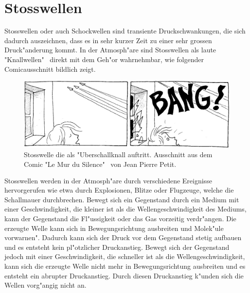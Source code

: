 \chapter{Stosswellen}
\begin{refsection}


Stosswellen oder auch Schockwellen sind transiente Druckschwankungen,
die sich dadurch auszeichnen, dass es in sehr kurzer Zeit zu einer sehr
grossen Druck"anderung kommt.
In der Atmosph"are sind Stosswellen als laute "Knallwellen" \, direkt
mit dem Geh"or wahrnehmbar, wie folgender Comicausschnitt bildlich zeigt.
\begin{figure}[h]
\begin{center}
\includegraphics[width=\hsize]{stosswellen/ueberschall.jpg}
\end{center}
\caption{Stosswelle die als "Uberschallknall auftritt. Ausschnitt aus dem Comic "Le Mur du Silence" \, von Jean Pierre Petit\cite{stoss:leMurDeSilence}.}
\label{stosswellen:ueberschall}
\end{figure}

Stosswellen werden in der Atmosph"are durch verschiedene Ereignisse
hervorgerufen wie etwa durch Explosionen, Blitze oder Flugzeuge,
welche die Schallmauer durchbrechen. Bewegt sich ein Gegenstand
durch ein Medium mit einer Geschwindigkeit, die kleiner ist als die
Wellengeschwindigkeit des Mediums, kann der Gegenstand die Fl"ussigkeit
oder das Gas vorzeitig verdr"angen. Die erzeugte Welle kann sich in
Bewegungsrichtung ausbreiten und Molek"ule \grqq vorwarnen". Dadurch
kann sich der Druck vor dem Gegenstand stetig aufbauen und es entsteht
kein pl"otzlicher Druckanstieg. Bewegt sich der Gegenstand jedoch mit
einer Geschwindigkeit, die schneller ist als die Wellengeschwindigkeit,
kann sich die erzeugte Welle nicht mehr in Bewegungsrichtung ausbreiten
und es entsteht ein abrupter Druckanstieg. Durch diesen Druckanstieg
k"unden sich die Wellen vorg"angig nicht an.


\end{refsection}
